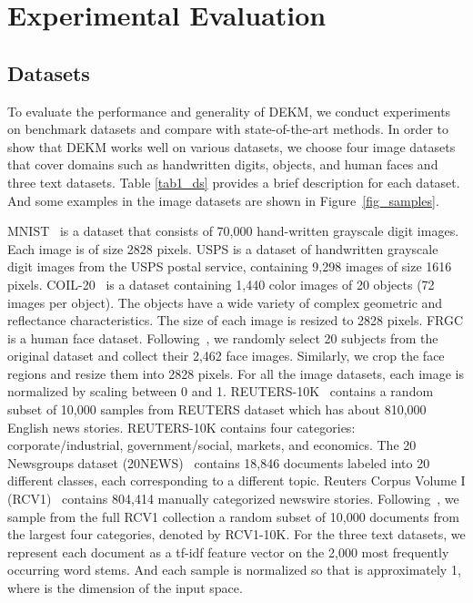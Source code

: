 \section{Experimental Evaluation}

\subsection{Datasets}

To evaluate the performance and generality of DEKM, we conduct experiments on benchmark datasets and compare with state-of-the-art methods. In order to show that DEKM works well on various datasets, we choose four image datasets that cover domains such as handwritten digits, objects,
and human faces and three text datasets. Table \ref{tab1_ds} provides a brief description for each dataset. And some examples in the image datasets are shown in Figure~\ref{fig_samples}.

MNIST~\cite{lecun1998gradient} is a dataset that consists of 70,000 hand-written grayscale digit images. Each image is of size 2828 pixels. USPS is a dataset of handwritten grayscale digit images from the USPS postal service, containing 9,298 images of size 1616 pixels. COIL-20~\cite{nene1996columbia} is a dataset containing 1,440 color images of 20 objects (72 images per object). The objects have a wide variety of complex geometric and reflectance characteristics. The size of each image is resized to 2828 pixels. FRGC is a human face dataset. Following~\cite{yang2016joint}, we randomly select 20 subjects from the original dataset and collect their 2,462 face images. Similarly, we crop the face regions and resize them into 2828 pixels. For all the image datasets, each image is normalized by scaling between 0 and 1. REUTERS-10K~\cite{DEC_xie2016unsupervised} contains a random subset of 10,000 samples from REUTERS dataset which has about 810,000 English news stories. REUTERS-10K contains four categories: corporate/industrial, government/social, markets, and economics. The 20 Newsgroups dataset (20NEWS)~\cite{lang1995newsweeder} contains 18,846 documents labeled into 20 different classes, each corresponding to a different topic. Reuters Corpus Volume I (RCV1)~\cite{lewis2004rcv1} contains 804,414 manually categorized newswire stories. Following~\cite{fard2020deep}, we sample from the full RCV1 collection a random subset of 10,000 documents from the largest four categories, denoted by RCV1-10K. For the three text datasets, we represent each document as a tf-idf feature vector on the 2,000 most frequently occurring word stems. And each sample  is normalized so that  is approximately 1, where  is the dimension of the input space.

